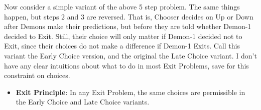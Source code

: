 \documentclass[
  12pt,
  letterpaper,
  DIV=11,
  numbers=noendperiod]{scrreprt}
\providecommand{\tightlist}{%
  \setlength{\itemsep}{0pt}\setlength{\parskip}{0pt}}\usepackage{longtable,booktabs,array}
\begin{document}
\begin{table}

\caption{\label{tbl-general-exit}The abstract form of an exit problem.}

\begin{minipage}[t]{0.50\linewidth}



\end{minipage}%
%
\begin{minipage}[t]{0.50\linewidth}



\end{minipage}%

\end{table}%

Now consider a simple variant of the above 5 step problem. The same
things happen, but steps 2 and 3 are reversed. That is, Chooser decides
on Up or Down after Demons make their predictions, but before they are
told whether Demon-1 decided to Exit. Still, their choice will only
matter if Demon-1 decided not to Exit, since their choices do not make a
difference if Demon-1 Exits. Call this variant the Early Choice version,
and the original the Late Choice variant. I don't have any clear
intuitions about what to do in most Exit Problems, save for this
constraint on choices.

\begin{itemize}
\tightlist
\item
  \textbf{Exit Principle}: In any Exit Problem, the same choices are
  permissible in the Early Choice and Late Choice variants.
\end{itemize}
\end{document}
